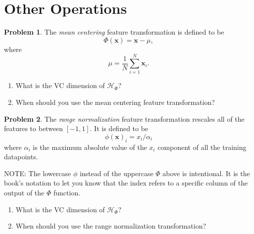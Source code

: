 \documentclass[10pt]{exam}
\theoremstyle{definition}
\newtheorem{problem}{Problem}
\newcommand{\x}{\mathbf x}
\newcommand{\HH}[1]{\mathcal H_{\text{#1}}}
\begin{document}
%

\newpage
\section*{Other Operations}

\begin{problem}
    The \emph{mean centering} feature transformation is defined to be
    \begin{equation}
        \Phi(\x) = \x - \mu,
    \end{equation}
    where
    \begin{equation}
        \mu = \frac 1 N \sum_{i=1}^N \x_i.
    \end{equation}
    \begin{enumerate}
        \item What is the VC dimension of $\HH{$\Phi$}$?
            \vspace{3in}
        \item When should you use the mean centering feature transformation?
            \vspace{2in}
    \end{enumerate}
\end{problem}

\newpage
\begin{problem}
    The \emph{range normalization} feature transformation rescales all of the features to between $[-1, 1]$.
    It is defined to be
    \begin{equation}
        \phi(\x)_i = x_i/\alpha_i
    \end{equation}
    where $\alpha_i$ is the maximum absolute value of the $x_i$ component of all the training datapoints.

    NOTE: The lowercase $\phi$ instead of the uppercase $\Phi$ above is intentional.
    It is the book's notation to let you know that the index refers to a specific column of the output of the $\Phi$ function.
    \begin{enumerate}
        \item What is the VC dimension of $\HH{$\Phi$}$?
            \vspace{3in}
        \item When should you use the range normalization transformation?
            \vspace{3in}
    \end{enumerate}
\end{problem}
\end{document}

